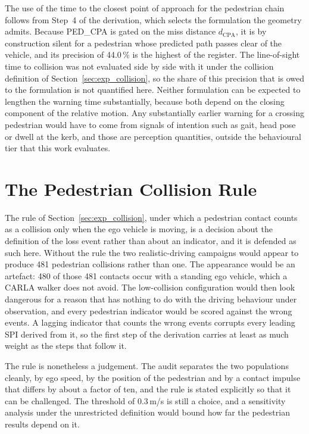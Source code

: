 The use of the time to the closest point of approach for the pedestrian chain
follows from Step~4 of the derivation, which selects the formulation the geometry
admits. Because PED\_CPA is gated on the miss distance
$d_\mathrm{CPA}$, it is by construction silent for a pedestrian whose predicted
path passes clear of the vehicle, and its precision of 44.0\,\% is the highest of
the register. The line-of-sight time to collision was not evaluated side by side with it under
the collision definition of Section~\ref{sec:exp_collision}, so the share of this
precision that is owed to the formulation is not quantified here. Neither
formulation can be expected to lengthen the warning time substantially, because
both depend on the closing component of the relative motion. Any substantially earlier
warning for a crossing pedestrian would have to come from signals of intention
such as gait, head pose or dwell at the kerb, and those are perception
quantities, outside the behavioural tier that this work evaluates.

\section{The Pedestrian Collision Rule}
\label{sec:disc_pedrule}

The rule of Section~\ref{sec:exp_collision}, under which a pedestrian contact
counts as a collision only when the ego vehicle is moving, is a decision about
the definition of the loss event rather than about an indicator, and it is defended as such
here. Without the rule the two realistic-driving campaigns would appear to produce 481
pedestrian collisions rather than one. The appearance would be an artefact: 480
of those 481 contacts occur with a standing ego vehicle, which a CARLA walker
does not avoid. The low-collision configuration would then look dangerous for a
reason that has nothing to do with the driving behaviour under observation, and
every pedestrian indicator would be scored against the wrong events. A lagging
indicator that counts the wrong events corrupts every leading SPI derived
from it, so the first step of the derivation carries at least as much weight as
the steps that follow it.

The rule is nonetheless a judgement. The audit separates the two populations
cleanly, by ego speed, by the position of the pedestrian and by a contact impulse
that differs by about a factor of ten, and the rule is stated explicitly so that
it can be challenged. The threshold of 0.3\,m/s is still a choice, and a
sensitivity analysis under the unrestricted definition would bound how far the
pedestrian results depend on it.

